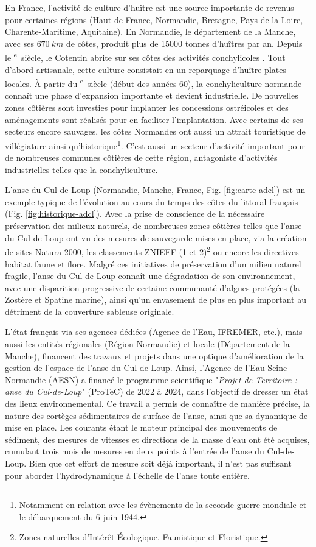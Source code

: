 \documentclass[10pt,a4paper,titlepage]{article}
\def\siecle#1{\textsc{\romannumeral #1}\textsuperscript{e}~siècle}
\begin{document}
    En France, l'activité de culture d'huître est une source importante de revenus pour certaines régions (Haut de France, Normandie, Bretagne, Pays de la Loire, Charente-Maritime, Aquitaine). En Normandie, le département de la Manche, avec ses $670~km$ de côtes, produit plus de \num{15000} tonnes d'huîtres par an. Depuis le \siecle{18}, le Cotentin abrite sur ses côtes des activités conchylicoles \parencite{Kopp2000}. Tout d'abord artisanale, cette culture consistait en un reparquage d'huître plates locales. À partir du \siecle{20} (début des années 60), la conchyliculture normande connaît une phase d'expansion importante et devient industrielle. De nouvelles zones côtières sont investies pour implanter les concessions ostréicoles et des aménagements sont réalisés pour en faciliter l'implantation.
    Avec certains de ses secteurs encore sauvages, les côtes Normandes ont aussi un attrait touristique de villégiature ainsi qu'historique\footnote{Notamment en relation avec les évènements de la seconde guerre mondiale et le débarquement du 6 juin 1944.}.  C'est aussi un secteur d'activité important pour de nombreuses communes côtières de cette région, antagoniste d'activités industrielles telles que la conchyliculture.

    L'anse du Cul-de-Loup (Normandie, Manche, France, Fig. \ref{fig:carte-adcl}) est un exemple typique de l'évolution au cours du temps des côtes du littoral français (Fig. \ref{fig:historique-adcl}). Avec la prise de conscience de la nécessaire préservation des milieux naturels, de nombreuses zones côtières telles que l'anse du Cul-de-Loup ont vu des mesures de sauvegarde mises en place, via la création de sites Natura 2000, les classements ZNIEFF (1 et 2)\footnote{Zones naturelles d’Intérêt Écologique, Faunistique et Floristique.}  ou encore les directives habitat faune et flore. Malgré ces initiatives de préservation d'un milieu naturel fragile, l'anse du Cul-de-Loup connaît une dégradation de son environnement, avec une disparition progressive de certaine communauté d'algues protégées (la Zostère et Spatine marine), ainsi qu'un envasement de plus en plus important au détriment de la couverture sableuse originale.

    L'état français via ses agences dédiées (Agence de l'Eau, IFREMER, etc.), mais aussi les entités régionales (Région Normandie) et locale (Département de la Manche), financent des travaux et projets dans une optique d'amélioration de la gestion de l'espace de l'anse du Cul-de-Loup. Ainsi, l'Agence de l'Eau Seine-Normandie (AESN) a financé le programme scientifique "\textit{Projet de Territoire : anse du Cul-de-Loup}" (ProTeC) de 2022 à 2024, dans l'objectif de dresser un état des lieux environnemental. Ce travail a permis de connaître de manière précise, la nature des cortèges sédimentaires de surface de l'anse, ainsi que sa dynamique de mise en place. Les courants étant le moteur principal des mouvements de sédiment, des mesures de vitesses et directions de la masse d'eau ont été acquises, cumulant trois mois de mesures en deux points à l'entrée de l'anse du Cul-de-Loup. Bien que cet effort de mesure soit déjà important, il n'est pas suffisant pour aborder l'hydrodynamique à l'échelle de l'anse toute entière.
\end{document}

